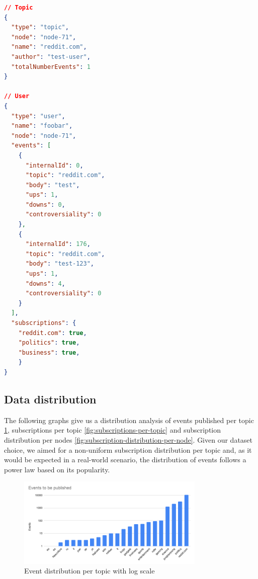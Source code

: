 \begin{lstlisting}[language=JSON, float, caption={Data example to be used in testbed},label={dataset-output}]
// Topic
{
  "type": "topic",
  "node": "node-71",
  "name": "reddit.com",
  "author": "test-user",
  "totalNumberEvents": 1
}

// User
{
  "type": "user",
  "name": "foobar",
  "node": "node-71",
  "events": [
    {
      "internalId": 0,
      "topic": "reddit.com",
      "body": "test",
      "ups": 1,
      "downs": 0,
      "controversiality": 0
    },
    {
      "internalId": 176,
      "topic": "reddit.com",
      "body": "test-123",
      "ups": 1,
      "downs": 4,
      "controversiality": 0
    }
  ],
  "subscriptions": {
  	"reddit.com": true,
  	"politics": true,
  	"business": true,
	}
}
\end{lstlisting}

\subsection{Data distribution}\label{subsec:data-distribution}

The following graphs give us a distribution analysis of events published per
topic \ref{fig:events-to-be-publisher-per-topic}, subscriptions per topic
\ref{fig:subscriptions-per-topic} and subscription distribution per nodes
\ref{fig:subscription-distribution-per-node}. Given our dataset choice, we
aimed for a non-uniform subscription distribution per topic and, as it would be
expected in a real-world scenario, the distribution of events follows a power
law based on its popularity. 

\begin{figure}[!htb]
  \centering
  \includegraphics[width=0.8\textwidth]{img/events-to-be-publisher-per-topic.png}
  \caption{Event distribution per topic with log scale}
  \label{fig:events-to-be-publisher-per-topic}
\end{figure}

